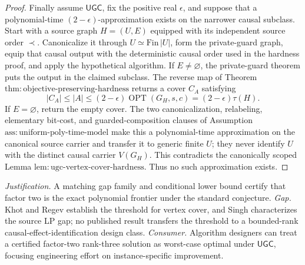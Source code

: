 \documentclass{article}
\begin{document}
\begin{proof}
Finally assume \(\mathsf{UGC}\), fix the positive real
\(\epsilon\), and suppose that a polynomial-time
\((2-\epsilon)\)-approximation exists on the narrower causal subclass.
Start with a source graph \(H=(U,E)\) equipped with its independent source
order \(\prec\).  Canonicalize it through
\(U\simeq\mathrm{Fin}\,|U|\), form the private-guard graph, equip that
causal output with the deterministic causal order used in the hardness
proof, and apply the hypothetical algorithm.  If \(E\neq\varnothing\),
the private-guard theorem puts the output in the claimed subclass.  The
reverse map of Theorem
\(\mathrm{thm{:}objective\mbox{-}preserving\mbox{-}hardness}\) returns a
cover \(C_A\) satisfying
\[
 |C_A|\leq|A|
 \leq(2-\epsilon)\operatorname{OPT}(G_H,s,c)
 =(2-\epsilon)\tau(H).
\]
If \(E=\varnothing\), return the empty cover.  The two canonicalization,
relabeling, elementary bit-cost, and guarded-composition clauses of
Assumption \(\mathrm{ass{:}uniform\mbox{-}poly\mbox{-}time\mbox{-}model}\)
make this a polynomial-time approximation on the canonical source carrier
and transfer it to generic finite \(U\); they never identify \(U\) with the
distinct causal carrier \(V(G_H)\).  This contradicts the canonically scoped
Lemma \(\mathrm{lem{:}ugc\mbox{-}vertex\mbox{-}cover\mbox{-}hardness}\).
Thus no such approximation exists.
\end{proof}
\par\smallskip\noindent \textit{Justification.} A matching gap family and conditional lower bound certify that factor two is the exact polynomial frontier under the standard conjecture. \textit{Gap.} Khot and Regev establish the threshold for vertex cover, and Singh characterizes the source LP gap; no published result transfers the threshold to a bounded-rank causal-effect-identification design class. \textit{Consumer.} Algorithm designers can treat a certified factor-two rank-three solution as worst-case optimal under \(\mathsf{UGC}\), focusing engineering effort on instance-specific improvement.
\end{document}
